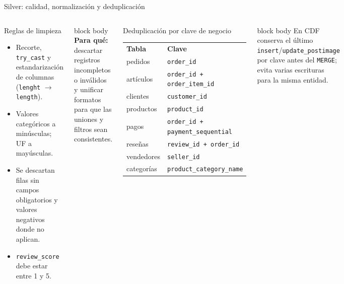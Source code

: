 \documentclass[aspectratio=169,10pt]{beamer}
\begin{document}
\begin{frame}{Silver: calidad, normalización y deduplicación}
  \begin{columns}[T,onlytextwidth]
      \begin{block}{Reglas de limpieza}
        \small
        \begin{itemize}\setlength\itemsep{.25em}
          \item Recorte, \texttt{try\_cast} y estandarización de columnas (\texttt{lenght} $\rightarrow$ \texttt{length}).
          \item Valores categóricos a minúsculas; UF a mayúsculas.
          \item Se descartan filas sin campos obligatorios y valores negativos donde no aplican.
          \item \texttt{review\_score} debe estar entre 1 y 5.
        \end{itemize}
      \end{block}
      \vspace{.2em}
      \begin{beamercolorbox}[rounded=true,sep=.4em,wd=\linewidth]{block body}
        \scriptsize\textbf{Para qué:} descartar registros incompletos o inválidos y
        unificar formatos para que las uniones y filtros sean consistentes.
      \end{beamercolorbox}
      \begin{block}{Deduplicación por clave de negocio}
        \scriptsize
        \begin{tabular}{@{}ll@{}}
          \textbf{Tabla} & \textbf{Clave}\\
          pedidos & \texttt{order\_id}\\
          artículos & \texttt{order\_id + order\_item\_id}\\
          clientes & \texttt{customer\_id}\\
          productos & \texttt{product\_id}\\
          pagos & \texttt{order\_id + payment\_sequential}\\
          reseñas & \texttt{review\_id + order\_id}\\
          vendedores & \texttt{seller\_id}\\
          categorías & \texttt{product\_category\_name}\\
        \end{tabular}
      \end{block}
      \vspace{.2em}
      \begin{beamercolorbox}[rounded=true,sep=.4em,wd=\linewidth]{block body}
        \scriptsize En CDF conserva el último \texttt{insert}/\texttt{update\_postimage}
        por clave antes del \texttt{MERGE}; evita varias escrituras para la misma entidad.
      \end{beamercolorbox}
  \end{columns}
\end{frame}
\end{document}
